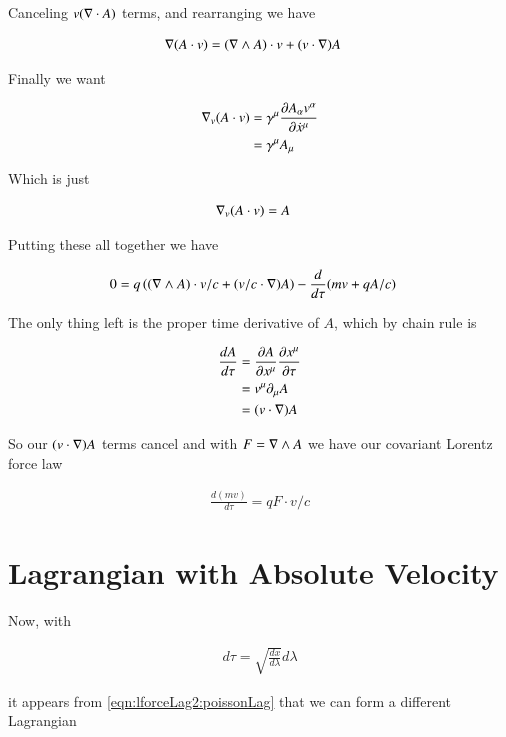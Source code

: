 Canceling $v(\grad \cdot A)$ terms, and rearranging we have

\begin{align}
\grad (A \cdot v)
&= (\grad \wedge A) \cdot v + (v \cdot \grad) A 
\end{align}

Finally we want

\begin{align*}
\grad_v (A \cdot v)
&=
\gamma^\mu \PD{\xdot^\mu}{ A_\alpha v^\alpha} \\
&=
\gamma^\mu A_\mu \\
\end{align*}

Which is just

\begin{align}
\grad_v (A \cdot v) &= A
\end{align}

Putting these all together we have

\begin{align*}
0 &= 
q \left( (\grad \wedge A) \cdot v/c + (v/c \cdot \grad) A \right)
- \frac{d}{d\tau} ( m v + q A/c)
\end{align*}

The only thing left is the proper time derivative of $A$, which by chain rule is

\begin{align*}
\frac{d A}{d\tau} 
&=
\PD{x^\mu}{A} \PD{\tau}{x^\mu} \\
&=
v^\mu \partial_\mu A \\
&= (v \cdot \grad) A
\end{align*}

So our $(v \cdot \grad)A$ terms cancel and with $F = \grad \wedge A$ we have our covariant Lorentz force law

\begin{align}
\frac{d(mv)}{d\tau} = q F \cdot v/c 
\end{align}

\section{Lagrangian with Absolute Velocity}

Now, with

\begin{align*}
d\tau = \sqrt{\frac{dx}{d\lambda}} d\lambda
\end{align*}

it appears from
\ref{eqn:lforceLag2:poissonLag}
that we can form a different Lagrangian

